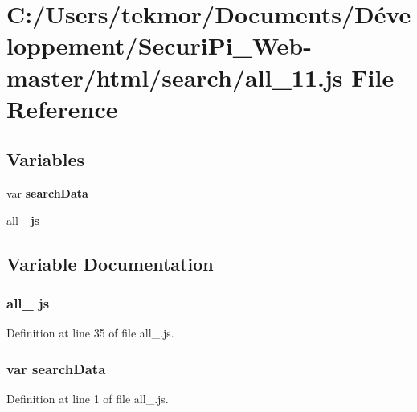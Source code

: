 \section{C\+:/\+Users/tekmor/\+Documents/\+Développement/\+Securi\+Pi\+\_\+\+Web-\/master/html/search/all\+\_\+11.js File Reference}
\label{all__11_8js}
\subsection*{Variables}
\begin{DoxyCompactItemize}
\item 
var {\bf search\+Data}
\item 
all\+\_ {\bf js}
\end{DoxyCompactItemize}


\subsection{Variable Documentation}
\subsubsection[{js}]{\setlength{\rightskip}{0pt plus 5cm}all\+\_ js}\label{all__11_8js_a36e8bb713520a15833bafb5d93f8949c}


Definition at line 35 of file all\+\_.\+js.

\subsubsection[{search\+Data}]{\setlength{\rightskip}{0pt plus 5cm}var search\+Data}\label{all__11_8js_ad01a7523f103d6242ef9b0451861231e}


Definition at line 1 of file all\+\_.\+js.

